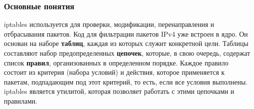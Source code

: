 \documentclass[a4paper]{article}
\begin{document}
	\subsubsection{Основные понятия}
	
	iptables используется для проверки, модификации, перенаправления и отбрасывания пакетов. Код для фильтрации пакетов IPv4 уже встроен в ядро. Он основан на наборе \textbf{таблиц}, каждая из которых служит конкретной цели. Таблицы составляют набор предопределенных \textbf{цепочек}, которые, в свою очередь, содержат список \textbf{правил}, организованных в определенном порядке. Каждое правило состоит из критерия (набора условий) и действия, которое применяется к пакетам, подпадающим под этот критерий, то есть, если все условия выполнены. iptables является утилитой, которая позволяет работать с этими цепочками и правилами.
\end{document}
